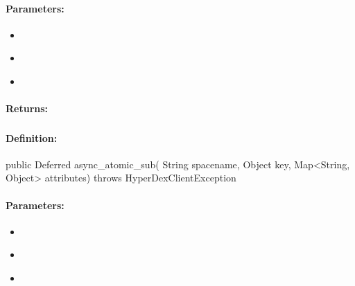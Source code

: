 \paragraph{Parameters:}
\begin{itemize}[noitemsep]
\item {}\\

\item {}\\

\item {}\\

\end{itemize}

\paragraph{Returns:}


\pagebreak
\subsubsection{}
\label{api:java:async_atomic_sub}


\paragraph{Definition:}
\begin{javacode}
public Deferred async_atomic_sub(
        String spacename,
        Object key,
        Map<String, Object> attributes) throws HyperDexClientException
\end{javacode}

\paragraph{Parameters:}
\begin{itemize}[noitemsep]
\item {}\\

\item {}\\

\item {}\\

\end{itemize}

